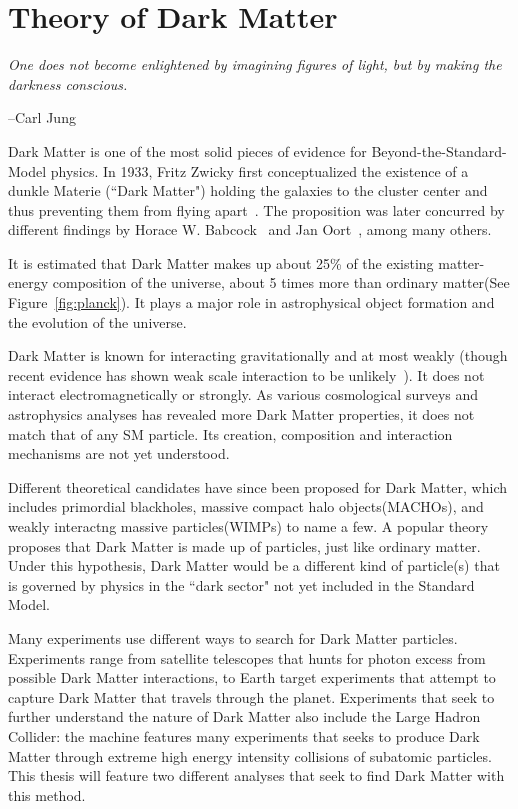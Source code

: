 \chapter{Theory of Dark Matter}
\label{chapter:DM}


\epigraph{\textit{One does not become enlightened by imagining figures of light, but by making the darkness conscious.}}{--Carl Jung}

Dark Matter is one of the most solid pieces of evidence for Beyond-the-Standard-Model physics. In 1933, Fritz Zwicky first conceptualized the existence of a dunkle Materie (``Dark Matter") holding the galaxies to the cluster center and thus preventing them from flying apart~\cite{Zwicky}. The proposition was later concurred by different findings by Horace W. Babcock~\cite{Babcock} and Jan Oort~\cite{oort}, among many others. 

It is estimated that Dark Matter makes up about 25\% of the existing matter-energy composition of the universe, about 5 times more than ordinary matter(See Figure~\ref{fig:planck}). It plays a major role in astrophysical object formation and the evolution of the universe. 

Dark Matter is known for interacting gravitationally and at most weakly (though recent evidence has shown weak scale interaction to be unlikely~\cite{DM2016}). It does not interact electromagnetically or strongly. As various cosmological surveys and astrophysics analyses has revealed more Dark Matter properties, it does not match that of any SM particle. Its creation, composition and interaction mechanisms are not yet understood.

Different theoretical candidates have since been proposed for Dark Matter, which includes primordial blackholes, massive compact halo objects(MACHOs), and weakly interactng massive particles(WIMPs) to name a few. A popular theory proposes that Dark Matter is made up of particles, just like ordinary matter. Under this hypothesis, Dark Matter would be a different kind of particle(s) that is governed by physics in the ``dark sector" not yet included in the Standard Model.

    Many experiments use different ways to search for Dark Matter particles. Experiments range from satellite telescopes that hunts for photon excess from possible Dark Matter interactions, to Earth target experiments that attempt to capture Dark Matter that travels through the planet. Experiments that seek to further understand the nature of Dark Matter also include the Large Hadron Collider: the machine features many experiments that seeks to produce Dark Matter through extreme high energy
intensity collisions of subatomic particles. This thesis will feature two different analyses that seek to find Dark Matter with this method. 

